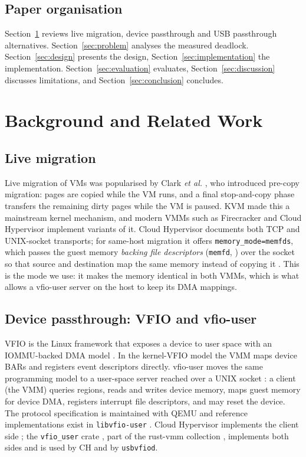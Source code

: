 \documentclass[10pt,conference]{IEEEtran}
\newcommand{\code}[1]{\texttt{#1}}
\begin{document}
\subsection{Paper organisation}
Section~\ref{sec:background} reviews live migration, device passthrough and
USB passthrough alternatives.  Section~\ref{sec:problem} analyses the measured
deadlock. Section~\ref{sec:design} presents the design,
Section~\ref{sec:implementation} the implementation.
Section~\ref{sec:evaluation} evaluates, Section~\ref{sec:discussion} discusses
limitations, and Section~\ref{sec:conclusion} concludes.

\section{Background and Related Work}
\label{sec:background}

\subsection{Live migration}
Live migration of VMs was popularised by Clark \emph{et al.}
\cite{clark2005live}, who introduced pre-copy migration: pages are copied
while the VM runs, and a final stop-and-copy phase transfers the remaining
dirty pages while the VM is paused. KVM \cite{kivity2007kvm} made this a
mainstream kernel mechanism, and modern VMMs such as Firecracker
\cite{agache2020firecracker} and Cloud Hypervisor \cite{chrepo} implement
variants of it. Cloud Hypervisor documents both TCP and UNIX-socket transports;
for same-host migration it offers \code{memory\_mode=memfds}, which passes the
guest memory \emph{backing file descriptors} (\code{memfd}, \cite{memfd}) over
the socket so that source and destination map the same memory instead of
copying it \cite{chlive}. This is
the mode we use: it makes the memory identical in both VMMs, which is what
allows a vfio-user server on the host to keep its DMA mappings.

\subsection{Device passthrough: VFIO and vfio-user}
VFIO is the Linux framework that exposes a device to user space with an
IOMMU-backed DMA model \cite{kernelvfio}. In the kernel-VFIO model the VMM maps
device BARs and registers event descriptors directly. vfio-user moves the same
programming model to a user-space server reached over a UNIX socket
\cite{qemuvfiouser}: a client (the VMM) queries regions, reads and writes
device memory, maps guest memory for device DMA, registers interrupt file
descriptors, and may reset the device. The protocol specification is maintained
with QEMU \cite{qemuvfiouser} and reference implementations exist in
\code{libvfio-user} \cite{libvfiouser}. Cloud Hypervisor implements the client
side \cite{chvfiouser}; the \code{vfio\_user} crate \cite{vfiousercrate}, part
of the rust-vmm collection \cite{rustvmmvfio}, implements both sides and is
used by CH and by \code{usbvfiod}.
\end{document}
